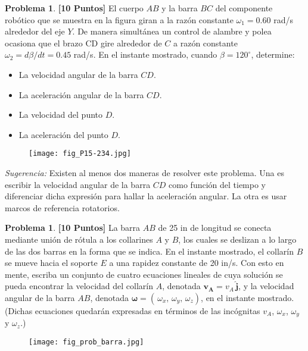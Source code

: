 \documentclass[ a4paper, twoside, 11pt]{article}
\renewcommand{\vec}[1]{{\boldsymbol{#1}}}
\theoremstyle{definition}
\newtheorem{problem}[definition]{Problema}
\begin{document}
\begin{problem}
\textbf{[10 Puntos]} El cuerpo $AB$ y la barra $BC$ del componente rob\'otico que se muestra en la figura giran a la raz\'on constante $\omega_1 = 0.60$ rad/s alrededor del eje $Y$. \linebreak De manera simult\'anea un control de alambre y polea ocasiona que el brazo CD gire alrededor de $C$ a raz\'on constante $\omega_2 = d\beta / dt = 0.45$ rad/s. En el instante mostrado, cuando $\beta = 120^{\circ}$, determine: 
\begin{itemize}
\item La velocidad angular de la barra $CD$. 
\item La aceleraci\'on angular de la barra $CD$. 
\item La velocidad del punto $D$. 
\item La aceleraci\'on del punto $D$. 
\end{itemize}

\begin{figure}[htb]
\centering
\texttt{[image: fig\_P15-234.jpg]}
\end{figure}

\emph{Sugerencia:} Existen al menos dos maneras de resolver este problema. Una es escribir la velocidad angular de la barra $CD$ como funci\'on del tiempo y diferenciar dicha expresi\'on para hallar la aceleraci\'on angular. La otra es usar marcos de referencia rotatorios. 

\end{problem}
\vspace{\baselineskip}

\begin{problem}
\textbf{[10 Puntos]} 
La barra $AB$ de 25 in de longitud se conecta mediante uni\'on de r\'otula a los collarines $A$ y $B$, los cuales se deslizan a lo largo de las dos barras en la forma que se indica. En el instante mostrado, el collar\'in $B$ se mueve hacia el soporte $E$ a una rapidez constante de 20 in/s. Con esto en mente, escriba un conjunto de cuatro ecuaciones lineales de cuya soluci\'on se pueda encontrar la velocidad del collar\'in $A$, denotada $\vec{v_A} = v_A \, \vec{\hat{j}}$, y la velocidad angular de la barra $AB$, denotada $\vec{\omega} = ( \, \omega_x, \, \omega_y, \, \omega_z)$, en el instante mostrado. (Dichas ecuaciones quedar\'an expresadas en t\'erminos de las inc\'ognitas $v_A$, $\omega_x$, $\omega_y$ y $\omega_z$.) 

\begin{figure}[htb]
\centering
\texttt{[image: fig\_prob\_barra.jpg]}
\end{figure}

\end{problem}
\vspace{\baselineskip}
\end{document}
